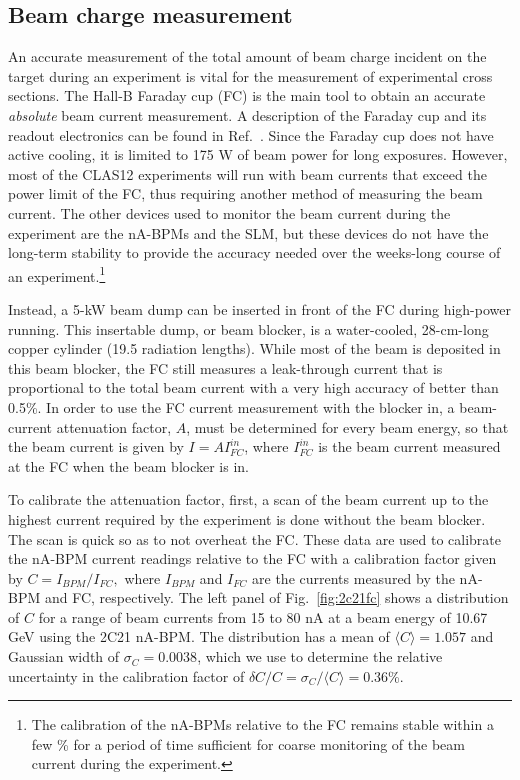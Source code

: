 
\subsection{Beam charge measurement}
\label{sec:FC}

An accurate measurement of the total amount of beam charge incident on the target during an experiment is vital for the measurement of 
experimental cross sections. The Hall-B Faraday cup (FC) is the main tool to obtain an accurate {\it absolute}  beam current  
measurement. A description of the Faraday cup and its readout electronics can be found in Ref.~\cite{CLAS}. 
Since the Faraday cup does not have active cooling, it is limited to 175 W of beam power for long exposures. 
However, most of the CLAS12 experiments will run with beam currents that exceed the power limit of the FC, thus requiring another method
of measuring the beam current. The other devices used to monitor the beam current during the experiment are the nA-BPMs and the SLM, 
but these devices do not have the long-term stability to provide the accuracy needed over the weeks-long course of an 
experiment.\footnote{The calibration of the nA-BPMs relative to the FC remains stable within a few \% for a period of time sufficient 
for coarse monitoring of the beam current during the experiment.}   

Instead, a 5-kW beam dump can be inserted in front of the FC during high-power running. This insertable dump, or beam blocker, is a 
water-cooled, 28-cm-long copper cylinder (19.5 radiation lengths).   While most of the beam is deposited in this beam blocker, the FC 
still measures a leak-through current that is proportional to the total beam current with a very high accuracy of better than 0.5\%. 
In order to use the FC current measurement with the blocker in, a beam-current attenuation factor, $A$, must be determined for every 
beam energy, so that the beam current is given by $I=A I_{FC}^{in}$, where $I_{FC}^{in}$ is the beam current measured at the FC when the
beam blocker is in. 

To calibrate the attenuation factor, first, a scan of the beam current up to the highest current required by the experiment is done 
without the beam blocker. The scan is quick so as to not overheat the FC.  These data are used to calibrate the nA-BPM current readings 
relative to the FC with a calibration factor given by $C={I_{BPM}}/{I_{FC}},$
where $I_{BPM}$ and $I_{FC}$ are the currents measured by the nA-BPM and FC, respectively. The left panel of Fig.~\ref{fig:2c21fc} 
shows a distribution of $C$ for a range of beam currents from 15 to 80 nA at a beam energy of 10.67 GeV using the 2C21 nA-BPM.
The distribution has a mean of $\langle C\rangle=1.057$ and Gaussian width of $\sigma_C=0.0038$, which we use to determine 
the relative uncertainty in the calibration factor of $\delta C/C=\sigma_C/\langle C\rangle=0.36$\%.
 
